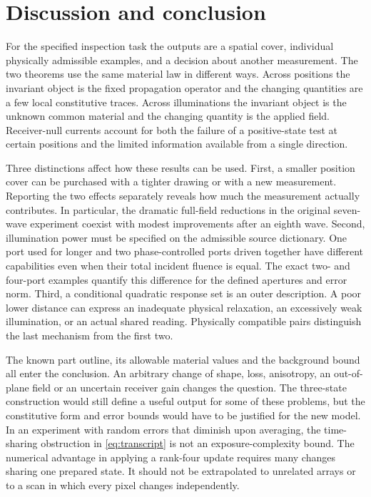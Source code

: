 \section{Discussion and conclusion}\label{sec:discussion}
For the specified inspection task the outputs are a spatial cover, individual physically admissible examples, and a decision about another measurement. The two theorems use the same material law in different ways. Across positions the invariant object is the fixed propagation operator and the changing quantities are a few local constitutive traces. Across illuminations the invariant object is the unknown common material and the changing quantity is the applied field. Receiver-null currents account for both the failure of a positive-state test at certain positions and the limited information available from a single direction.

Three distinctions affect how these results can be used. First, a smaller position cover can be purchased with a tighter drawing or with a new measurement. Reporting the two effects separately reveals how much the measurement actually contributes. In particular, the dramatic full-field reductions in the original seven-wave experiment coexist with modest improvements after an eighth wave. Second, illumination power must be specified on the admissible source dictionary. One port used for longer and two phase-controlled ports driven together have different capabilities even when their total incident fluence is equal. The exact two- and four-port examples quantify this difference for the defined apertures and error norm. Third, a conditional quadratic response set is an outer description. A poor lower distance can express an inadequate physical relaxation, an excessively weak illumination, or an actual shared reading. Physically compatible pairs distinguish the last mechanism from the first two.

The known part outline, its allowable material values and the background bound all enter the conclusion. An arbitrary change of shape, loss, anisotropy, an out-of-plane field or an uncertain receiver gain changes the question. The three-state construction would still define a useful output for some of these problems, but the constitutive form and error bounds would have to be justified for the new model. In an experiment with random errors that diminish upon averaging, the time-sharing obstruction in \eqref{eq:transcript} is not an exposure-complexity bound. The numerical advantage in applying a rank-four update requires many changes sharing one prepared state. It should not be extrapolated to unrelated arrays or to a scan in which every pixel changes independently.

